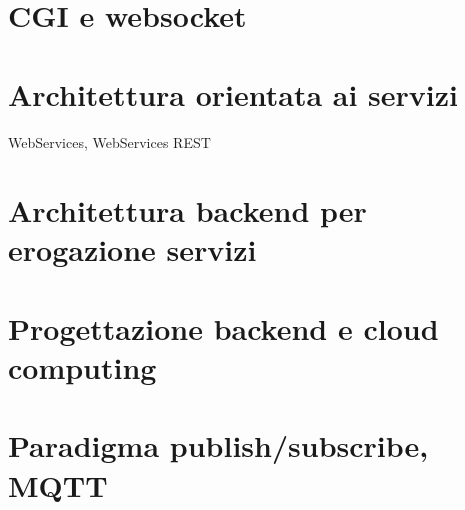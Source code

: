 \section{CGI e websocket}

%

\section{Architettura orientata ai servizi}
WebServices, WebServices REST

%

\section{Architettura backend per erogazione servizi}

%

\section{Progettazione backend e cloud computing}

%

\section{Paradigma publish/subscribe, MQTT}